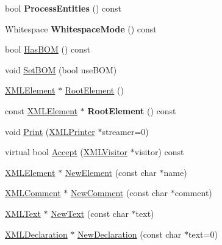\begin{DoxyCompactItemize}
\item 
\mbox{\label{classtinyxml2_1_1XMLDocument_a53e6c035b1b539563fef8c817fb30469}} 
bool {\bfseries Process\+Entities} () const
\item 
\mbox{\label{classtinyxml2_1_1XMLDocument_a810ce508e6e0365497c2a9deb83c9ca7}} 
Whitespace {\bfseries Whitespace\+Mode} () const
\item 
bool \hyperlink{classtinyxml2_1_1XMLDocument_a33fc5d159db873a179fa26338adb05bd}{Has\+B\+OM} () const
\item 
void \hyperlink{classtinyxml2_1_1XMLDocument_a14419b698f7c4b140df4e80f3f0c93b0}{Set\+B\+OM} (bool use\+B\+OM)
\item 
\hyperlink{classtinyxml2_1_1XMLElement}{X\+M\+L\+Element} $\ast$ \hyperlink{classtinyxml2_1_1XMLDocument_ad2b70320d3c2a071c2f36928edff3e1c}{Root\+Element} ()
\item 
\mbox{\label{classtinyxml2_1_1XMLDocument_a2be8ef9d6346bdef34311f91529afae4}} 
const \hyperlink{classtinyxml2_1_1XMLElement}{X\+M\+L\+Element} $\ast$ {\bfseries Root\+Element} () const
\item 
void \hyperlink{classtinyxml2_1_1XMLDocument_a2e57602756e197341711a4a0b84c52c5}{Print} (\hyperlink{classtinyxml2_1_1XMLPrinter}{X\+M\+L\+Printer} $\ast$streamer=0)
\item 
virtual bool \hyperlink{classtinyxml2_1_1XMLDocument_ab7be651917a35ab1ff0e4e6d4e565cdf}{Accept} (\hyperlink{classtinyxml2_1_1XMLVisitor}{X\+M\+L\+Visitor} $\ast$visitor) const
\item 
\hyperlink{classtinyxml2_1_1XMLElement}{X\+M\+L\+Element} $\ast$ \hyperlink{classtinyxml2_1_1XMLDocument_a3c335a700a43d7c363a393142a23f234}{New\+Element} (const char $\ast$name)
\item 
\hyperlink{classtinyxml2_1_1XMLComment}{X\+M\+L\+Comment} $\ast$ \hyperlink{classtinyxml2_1_1XMLDocument_a386df0befd06aadb5e0cd21381aa955a}{New\+Comment} (const char $\ast$comment)
\item 
\hyperlink{classtinyxml2_1_1XMLText}{X\+M\+L\+Text} $\ast$ \hyperlink{classtinyxml2_1_1XMLDocument_acece5de77a0819f2341b08c1e1ed9987}{New\+Text} (const char $\ast$text)
\item 
\hyperlink{classtinyxml2_1_1XMLDeclaration}{X\+M\+L\+Declaration} $\ast$ \hyperlink{classtinyxml2_1_1XMLDocument_ae519030c0262fa2daff8993681990e16}{New\+Declaration} (const char $\ast$text=0)

\end{DoxyCompactItemize}
